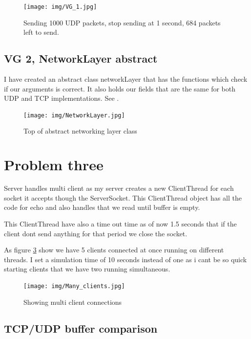 \documentclass[a4paper,12pt]{article}
\numberwithin{figure}{section}
\begin{document}
\begin{figure}[h!]
	\centering
	\texttt{[image: img/VG\_1.jpg]} 
	\caption{Sending 1000 UDP packets, stop sending at 1 second, 684 packets left to send.}
	\label{VG}
\end{figure}

\subsection{VG 2, NetworkLayer abstract}

I have created an abstract class networkLayer that has the functions which check if our arguments is correct. It also holds our fields that are the same for both UDP and TCP implementations. See \cite{myFiles}.

\begin{figure}[h!]
	\centering
	\texttt{[image: img/NetworkLayer.jpg]} 
	\caption{Top of abstract networking layer class}
	\label{layer}
\end{figure}

\newpage

\section{Problem three}

Server handles multi client as my server creates a new ClientThread for each socket it accepts though the ServerSocket. This ClientThread object has all the code for echo and also handles that we read until buffer is empty. 

This ClientThread have also a time out time as of now 1.5 seconds that if the client dont send anything for that period we close the socket.

As figure \ref{clients} show we have 5 clients connected at once running on different threads. 
I set a simulation time of 10 seconds instead of one as i cant be so quick starting clients that we have two running simultaneous.

\begin{figure}[h!]
	\centering
	\texttt{[image: img/Many\_clients.jpg]} 
	\caption{Showing multi client connections}
	\label{clients}
\end{figure}

\subsection{TCP/UDP buffer comparison} 
\end{document}
